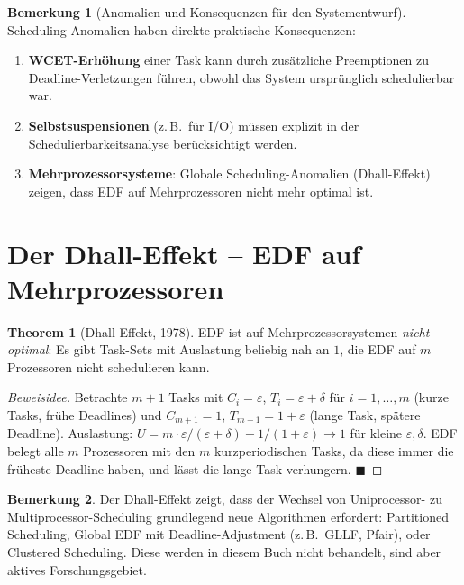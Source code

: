 ﻿\documentclass[a4paper,12pt]{report}
\theoremstyle{definition}
\newtheorem{bemerkung}{Bemerkung}[chapter]
\newtheorem{theorem}{Theorem}[chapter]
\begin{document}
\begin{bemerkung}[Anomalien und Konsequenzen für den Systementwurf]
	Scheduling-Anomalien haben direkte praktische Konsequenzen:
	\begin{enumerate}
		\item \textbf{WCET-Erhöhung} einer Task kann durch zusätzliche Preemptionen
		      zu Deadline-Verletzungen führen, obwohl das System ursprünglich
		      schedulierbar war.
		\item \textbf{Selbstsuspensionen} (z.\,B.\ für I/O) müssen explizit in
		      der Schedulierbarkeitsanalyse berücksichtigt werden.
		\item \textbf{Mehrprozessorsysteme}: Globale Scheduling-Anomalien
		      (Dhall-Effekt) zeigen, dass EDF auf Mehrprozessoren nicht mehr
		      optimal ist.
	\end{enumerate}
\end{bemerkung}

\section{Der Dhall-Effekt -- EDF auf Mehrprozessoren}

\begin{theorem}[Dhall-Effekt, 1978]
	EDF ist auf Mehrprozessorsystemen \emph{nicht optimal}: Es gibt Task-Sets
	mit Auslastung beliebig nah an $1$, die EDF auf $m$ Prozessoren nicht
	schedulieren kann.
\end{theorem}

\begin{proof}[Beweisidee]
	Betrachte $m+1$ Tasks mit $C_i = \varepsilon$, $T_i = \varepsilon + \delta$
	für $i=1,\ldots,m$ (kurze Tasks, frühe Deadlines) und $C_{m+1} = 1$,
	$T_{m+1} = 1+\varepsilon$ (lange Task, spätere Deadline). Auslastung:
	$U = m \cdot \varepsilon/(\varepsilon+\delta) + 1/(1+\varepsilon) \to 1$
	für kleine $\varepsilon, \delta$. EDF belegt alle $m$ Prozessoren mit
	den $m$ kurzperiodischen Tasks, da diese immer die früheste Deadline haben,
	und lässt die lange Task verhungern. \hfill$\blacksquare$
\end{proof}

\begin{bemerkung}
	Der Dhall-Effekt zeigt, dass der Wechsel von Uniprocessor- zu
	Multiprocessor-Scheduling grundlegend neue Algorithmen erfordert:
	Partitioned Scheduling, Global EDF mit Deadline-Adjustment (z.\,B.\
	GLLF, Pfair), oder Clustered Scheduling. Diese werden in diesem Buch
	nicht behandelt, sind aber aktives Forschungsgebiet.
\end{bemerkung}
\end{document}
